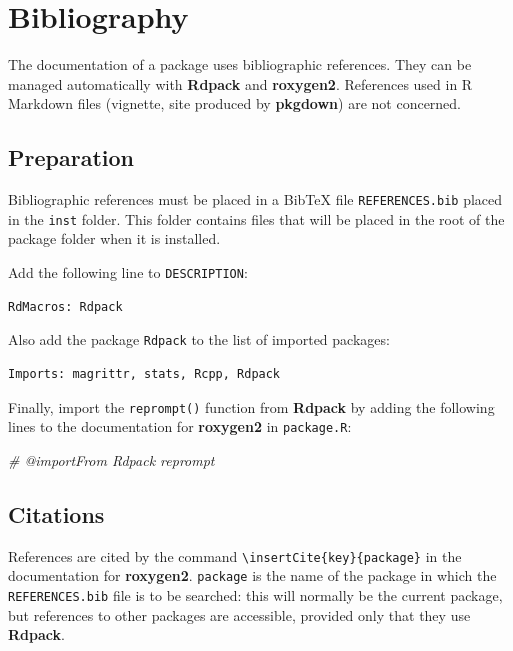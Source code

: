 \documentclass[
  12pt,
  american,
  a4paper,
  extrafontsizes,onecolumn,openright
  ]{memoir}
\newenvironment{Shaded}{\begin{snugshade}}{\end{snugshade}}
\newcommand{\CommentTok}[1]{\textcolor[rgb]{0.56,0.35,0.01}{\textit{#1}}}
\begin{document}
\section{Bibliography}\label{bibliography-1}

The documentation of a package uses bibliographic references.
They can be managed automatically with \textbf{Rdpack} and \textbf{roxygen2}.
References used in R Markdown files (vignette, site produced by \textbf{pkgdown}) are not concerned.

\subsection{Preparation}\label{preparation}

Bibliographic references must be placed in a BibTeX file \texttt{REFERENCES.bib} placed in the \texttt{inst} folder.
This folder contains files that will be placed in the root of the package folder when it is installed.

Add the following line to \texttt{DESCRIPTION}:

\begin{verbatim}
RdMacros: Rdpack
\end{verbatim}

Also add the package \texttt{Rdpack} to the list of imported packages:

\begin{verbatim}
Imports: magrittr, stats, Rcpp, Rdpack
\end{verbatim}

Finally, import the \texttt{reprompt()} function from \textbf{Rdpack} by adding the following lines to the documentation for \textbf{roxygen2} in \texttt{package.R}:

\scriptsize

\begin{Shaded}
\begin{Highlighting}[]
\CommentTok{\#\textquotesingle{} @importFrom Rdpack reprompt}
\end{Highlighting}
\end{Shaded}

\normalsize

\subsection{Citations}\label{citations}

References are cited by the command \texttt{\textbackslash{}insertCite\{key\}\{package\}} in the documentation for \textbf{roxygen2}.
\texttt{package} is the name of the package in which the \texttt{REFERENCES.bib} file is to be searched: this will normally be the current package, but references to other packages are accessible, provided only that they use \textbf{Rdpack}.
\end{document}
